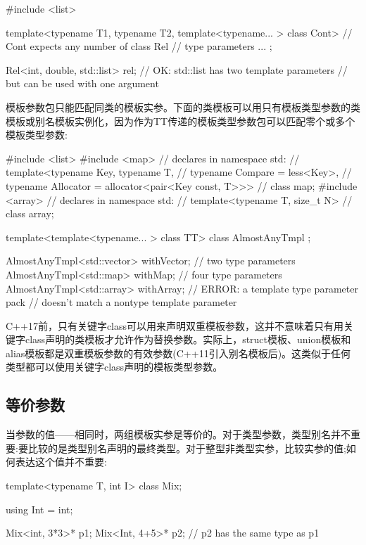 \begin{cpp}
#include <list>

template<typename T1, typename T2,
		template<typename... > class Cont> // Cont expects any number of
class Rel { // type parameters
	...
};

Rel<int, double, std::list> rel; // OK: std::list has two template parameters
								// but can be used with one argument
\end{cpp}

模板参数包只能匹配同类的模板实参。下面的类模板可以用只有模板类型参数的类模板或别名模板实例化，因为作为TT传递的模板类型参数包可以匹配零个或多个模板类型参数:

\begin{cpp}
#include <list>
#include <map>
	// declares in namespace std:
	// template<typename Key, typename T,
	// typename Compare = less<Key>,
	// typename Allocator = allocator<pair<Key const, T>>>
	// class map;
#include <array>
	// declares in namespace std:
	// template<typename T, size_t N>
	// class array;
	
template<template<typename... > class TT>
class AlmostAnyTmpl {
};

AlmostAnyTmpl<std::vector> withVector; // two type parameters
AlmostAnyTmpl<std::map> withMap; // four type parameters
AlmostAnyTmpl<std::array> withArray; // ERROR: a template type parameter pack
									// doesn’t match a nontype template parameter
\end{cpp}

C++17前，只有关键字class可以用来声明双重模板参数，这并不意味着只有用关键字class声明的类模板才允许作为替换参数。实际上，struct模板、union模板和alias模板都是双重模板参数的有效参数(C++11引入别名模板后)。这类似于任何类型都可以使用关键字class声明的模板类型参数。

\subsection{等价参数}

当参数的值——相同时，两组模板实参是等价的。对于类型参数，类型别名并不重要:要比较的是类型别名声明的最终类型。对于整型非类型实参，比较实参的值;如何表达这个值并不重要:

\begin{cpp}
template<typename T, int I>
class Mix;

using Int = int;

Mix<int, 3*3>* p1;
Mix<Int, 4+5>* p2; // p2 has the same type as p1
\end{cpp}

